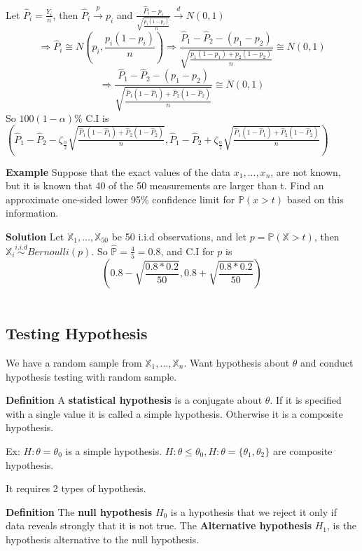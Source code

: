 Let $\hat{P}_i = \frac{Y_i}{n}$, then $\hat{P}_i \overset{p}{\to} p_i$ and $\frac{\hat{P}_i - p_i}{\sqrt{\frac{p_i(1-p_i)}{n}}} \overset{d}{\to} N(0, 1)$
$$\Rightarrow \hat{P}_i \cong N(p_i, \frac{p_i(1-p_i)}{n}) \Rightarrow \frac{\hat{P}_1 - \hat{P}_2 - (p_1 - p_2)}{\sqrt{\frac{p_1(1-p_1) + p_2(1-p_2)}{n}}} \cong N(0, 1)$$
$$\Rightarrow \frac{\hat{P}_1 - \hat{P}_2 - (p_1 - p_2)}{\sqrt{\frac{\hat{P}_1(1-\hat{P}_1) + \hat{P}_2(1-\hat{P}_2)}{n}}} \cong N(0, 1)$$
So $100(1-\alpha)\%$ C.I is $(\hat{P}_1 - \hat{P}_2 - \zeta_\frac{\alpha}{2}\sqrt{\frac{\hat{P}_1(1-\hat{P}_1) + \hat{P}_2(1-\hat{P}_2)}{n}}, \hat{P}_1 - \hat{P}_2 + \zeta_\frac{\alpha}{2}\sqrt{\frac{\hat{P}_1(1-\hat{P}_1) + \hat{P}_2(1-\hat{P}_2)}{n}})$

\textbf{Example} Suppose that the exact values of the data $x_1, ..., x_n$, are not known, but it is known that 40 of the 50 measurements are larger than t. Find an approximate one-sided lower 95\% confidence limit for $\mathbb{P}(x>t)$ based on this information.

\textbf{Solution} Let $\mathbb{X}_1, ..., \mathbb{X}_{50}$ be 50 i.i.d observations, and let $p = \mathbb{P}(\mathbb{X}>t)$, then $\mathbb{X}_i \overset{i.i.d}{\sim} Bernoulli(p)$. So $\hat{\mathbb{P}} = \frac{4}{5} = 0.8$, and C.I for $p$ is 
$$(0.8 - \sqrt{\frac{0.8 * 0.2}{50}}, 0.8 + \sqrt{\frac{0.8 * 0.2}{50}})$$\\

\subsection{Testing Hypothesis}
We have a random sample from $\mathbb{X}_1, ..., \mathbb{X}_n$. Want hypothesis about $\theta$ and conduct hypothesis testing with random sample.

\textbf{Definition} A \textbf{statistical hypothesis} is a conjugate about $\theta$. If it is specified with a single value it is called a simple hypothesis. Otherwise it is a composite hypothesis.

Ex: $H: \theta = \theta_0$ is a simple hypothesis. $H: \theta \leq \theta_0, H:\theta = \{\theta_1, \theta_2 \}$ are composite hypothesis.

It requires 2 types of hypothesis.

\textbf{Definition} The \textbf{null hypothesis} $H_0$ is a hypothesis that we reject it only if data reveals strongly that it is not true. The \textbf{Alternative hypothesis} $H_1$, is the hypothesis alternative to the null hypothesis.

